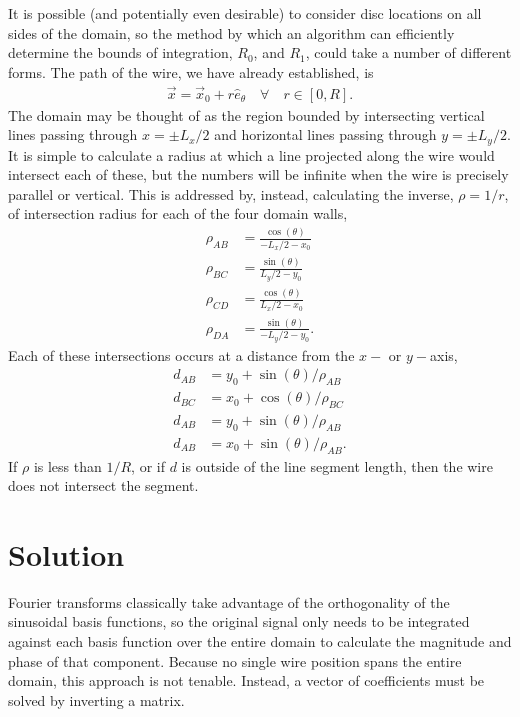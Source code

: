 \documentclass{article}
\def\x{\vec{x}}
\def\eth{\hat{e}_\theta}
\begin{document}
It is possible (and potentially even desirable) to consider disc locations on all sides of the domain, so the method by which an algorithm can efficiently determine the bounds of integration, $R_0$, and $R_1$, could take a number of different forms.  The path of the wire, we have already established, is
\begin{align}
\x = \x_0 + r \eth \hspace{1em} \forall \hspace{1em} r \in [0,R].
\end{align}
The domain may be thought of as the region bounded by intersecting vertical lines passing through $x=\pm L_x/2$ and horizontal lines passing through $y=\pm L_y/2$.  It is simple to calculate a radius at which a line projected along the wire would intersect each of these, but the numbers will be infinite when the wire is precisely parallel or vertical.  This is addressed by, instead, calculating the inverse, $\rho = 1/r$, of intersection radius for each of the four domain walls,
\begin{subequations}
\begin{align}
\rho_{AB} &= \frac{\cos(\theta)}{-L_x/2 - x_0}\\
\rho_{BC} &= \frac{\sin(\theta)}{L_y/2 - y_0}\\
\rho_{CD} &= \frac{\cos(\theta)}{L_x/2 - x_0}\\
\rho_{DA} &= \frac{\sin(\theta)}{-L_y/2 - y_0}.
\end{align}
\end{subequations}
Each of these intersections occurs at a distance from the $x-$ or $y-$axis,
\begin{align}
d_{AB} &= y_0 + \sin(\theta)/\rho_{AB}\\
d_{BC} &= x_0 + \cos(\theta)/\rho_{BC}\\
d_{AB} &= y_0 + \sin(\theta)/\rho_{AB}\\
d_{AB} &= x_0 + \sin(\theta)/\rho_{AB}.
\end{align}
If $\rho$ is less than $1/R$, or if $d$ is outside of the line segment length, then the wire does not intersect the segment.



\section{Solution}

Fourier transforms classically take advantage of the orthogonality of the sinusoidal basis functions, so the original signal only needs to be integrated against each basis function over the entire domain to calculate the magnitude and phase of that component.  Because no single wire position spans the entire domain, this approach is not tenable.  Instead, a vector of coefficients must be solved by inverting a matrix.
\end{document}

